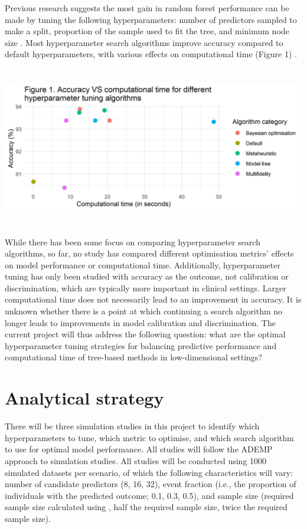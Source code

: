 \documentclass{article}
\begin{document}
Previous research suggests the most gain in random forest performance can be made by tuning the following hyperparameters: number of predictors sampled to make a split, proportion of the sample used to fit the tree, and minimum node size \cite{probst_tunability_2019}. Most hyperparameter search algorithms improve accuracy compared to default hyperparameters, with various effects on computational time (Figure 1) \cite{yang_hyperparameter_2020}.\\
\\
\centerline{\includegraphics[height = 6cm]{figure1.jpg}}
\\
While there has been some focus on comparing hyperparameter search algorithms, so far, no study has compared different optimisation metrics' effects on model performance or computational time. Additionally, hyperparameter tuning has only been studied with accuracy as the outcome, not calibration or discrimination, which are typically more important in clinical settings.
\newpage
Larger computational time does not necessarily lead to an improvement in accuracy. It is unknown whether there is a point at which continuing a search algorithm no longer leads to improvements in model calibration and discrimination. The current project will thus address the following question: what are the optimal hyperparameter tuning strategies for balancing predictive performance and computational time of tree-based methods in low-dimensional settings?

\section{Analytical strategy}

There will be three simulation studies in this project to identify which hyperparameters to tune, which metric to optimise, and which search algorithm to use for optimal model performance. All studies will follow the ADEMP \cite{morris_using_2019} approach to simulation studies. All studies will be conducted using 1000 simulated datasets per scenario, of which the following characteristics will vary: number of candidate predictors (8, 16, 32), event fraction (i.e., the proportion of individuals with the predicted outcome; 0.1, 0.3, 0.5), and sample size (required sample size calculated using \cite{riley_calculating_2020}, half the required sample size, twice the required sample size).\\
\end{document}
